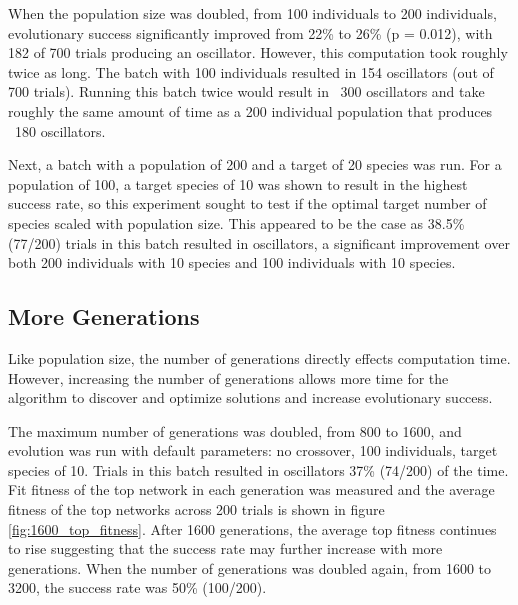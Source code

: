 \documentclass[12pt]{report}
\begin{document}
When the population size was doubled, from 100 individuals to 200 individuals, evolutionary success significantly improved from 22\% to 26\% (p = 0.012), with 182 of 700 trials producing an oscillator. However, this computation took roughly twice as long. The batch with 100 individuals resulted in 154 oscillators (out of 700 trials). Running this batch twice would result in ~300 oscillators and take roughly the same amount of time as a 200 individual population that produces ~180 oscillators.

Next, a batch with a population of 200 and a target of 20 species was run. For a population of 100, a target species of 10 was shown to result in the highest success rate, so this experiment sought to test if the optimal target number of species scaled with population size. This appeared to be the case as 38.5\% (77/200) trials in this batch resulted in oscillators, a significant improvement over both 200 individuals with 10 species and 100 individuals with 10 species. 

\subsection{More Generations}
Like population size, the number of generations directly effects computation time. However, increasing the number of generations allows more time for the algorithm to discover and optimize solutions and increase evolutionary success. 

The maximum number of generations was doubled, from 800 to 1600, and evolution was run with default parameters: no crossover, 100 individuals, target species of 10. Trials in this batch resulted in oscillators 37\% (74/200) of the time. Fit fitness of the top network in each generation was measured and the average fitness of the top networks across 200 trials is shown in figure \ref{fig:1600_top_fitness}. After 1600 generations, the average top fitness continues to rise suggesting that the success rate may further increase with more generations. When the number of generations was doubled again, from 1600 to 3200, the success rate was 50\% (100/200).
 
\end{document}
